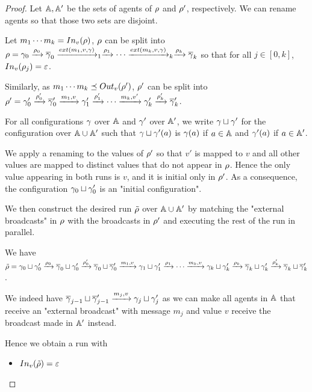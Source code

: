 \begin{proof}
	Let $\mathbb{A}, \mathbb{A}'$ be the sets of agents of $\rho$ and $\rho'$, respectively.
	We can rename agents so that those two sets are disjoint.
	
	Let $m_1 \cdots m_k = \vinput{v}{\run}$, $\rho$ can be split into $\run = \config_0 \step{\run_0} \overline{\config}_0 \extbr{m_1,v} \config_{1} \step{\run_1} \cdots \extbr{m_k,v} \config_{k} \step{\run_k} \overline{\config}_k$ so that for all $j\in [0,k]$, $\vinput{v}{\run_j} = \varepsilon$.
	
	Similarly, as $m_1\cdots m_k \subword \voutput{v}{\run'}$, $\rho'$ can be split into $\rho' = \gamma'_0 \xrightarrow{\rho'_0} \overline{\gamma}'_0 \xrightarrow{m_1, v} \gamma'_{1} \xrightarrow{\rho'_1} \cdots \xrightarrow{m_k,v'} \gamma'_{k} \xrightarrow{\rho'_k} \overline{\gamma}'_k$.
	
	For all configurations $\gamma$ over $\mathbb{A}$ and $\gamma'$ over $\mathbb{A}'$, we write $\gamma \sqcup \gamma'$ for the configuration over $\mathbb{A} \cup \mathbb{A}'$ such that $\gamma \sqcup \gamma'(a)$ is $\gamma(a)$ if $a \in \mathbb{A}$ and $\gamma'(a)$ if $a \in \mathbb{A}'$.
	
	We apply a renaming to the values of $\rho'$ so that $v'$ is mapped to $v$ and all other values are mapped to distinct values that do not appear in $\rho$.
	Hence the only value appearing in both runs is $v$, and it is initial only in $\rho'$. As a consequence, the configuration $\gamma_0 \sqcup \gamma'_0$ is an "initial configuration".
	
	We then construct the desired run $\Tilde{\rho}$ over $\mathbb{A} \cup \mathbb{A}'$ by matching the "external broadcasts" in $\rho$ with the broadcasts in $\rho'$ and executing the rest of the run in parallel.
	
	We have $\Tilde{\rho} = \gamma_0 \sqcup \gamma'_0 \xrightarrow{\rho_0} \overline{\gamma}_0 \sqcup \gamma'_0 \xrightarrow{\rho'_0} \overline{\gamma}_0 \sqcup \overline{\gamma}'_0 \xrightarrow{m_1, v} \gamma_{1} \sqcup \gamma'_1 \xrightarrow{\rho_1} \cdots \xrightarrow{m_k,v} \gamma_{k}  \sqcup \gamma'_{k} \xrightarrow{\rho_k}  \overline{\gamma}_k \sqcup \gamma'_k \xrightarrow{\rho'_k} \overline{\gamma}_k \sqcup \overline{\gamma}'_k$.
	
	We indeed have $\overline{\gamma}_{j-1} \sqcup \overline{\gamma}'_{j-1} \xrightarrow{m_j, v} \gamma_{j} \sqcup \gamma'_j$ as we can make all agents in $\mathbb{A}$ that receive an "external broadcast" with message $m_j$ and value $v$ receive the broadcast made in $\mathbb{A}'$ instead.
	
	Hence we obtain a run with 
	\begin{itemize}
		\item $\vinput{v}{\Tilde{\run}} = \varepsilon$ 
		

\end{itemize}
\end{proof}
